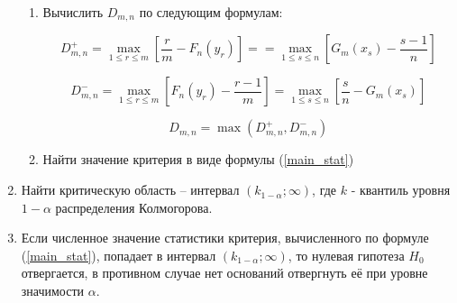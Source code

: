 \begin{enumerate}
\begin{enumerate}
		\item Вычислить $D_{m,n}$ по следующим формулам:
		
		\begin{equation}
			D^+_{m,n} = \max_{1 \leq r \leq m}\left[\frac{r}{m} - F_n(y_r)\right] == \max_{1 \leq s \leq n} \left[G_m(x_s) - \frac{s - 1}{n}\right]
		\end{equation}
	
		\begin{equation}
			D^-_{m,n} = \max_{1 \leq r \leq m}\left[F_n(y_r) - \frac{r - 1}{m}\right] = \max_{1 \leq s \leq n} \left[\frac{s}{n} - G_m(x_s)\right]
		\end{equation}
	
		\begin{equation}
			D_{m,n} = \max \left(D^+_{m,n}, D^-_{m,n}\right)
		\end{equation}
	
		\item Найти значение критерия в виде формулы (\ref{main_stat})
	
	\end{enumerate}

	\item Найти критическую область -- интервал $(k_{1 - \alpha}; \infty)$, где $k$ - квантиль уровня $1 - \alpha$ распределения Колмогорова.
	\item Если численное значение статистики критерия, вычисленного по формуле (\ref{main_stat}), попадает в интервал $(k_{1- \alpha}; \infty)$, то нулевая гипотеза $H_0$ отвергается, в противном случае нет оснований отвергнуть её при уровне значимости $\alpha$.

\end{enumerate}
